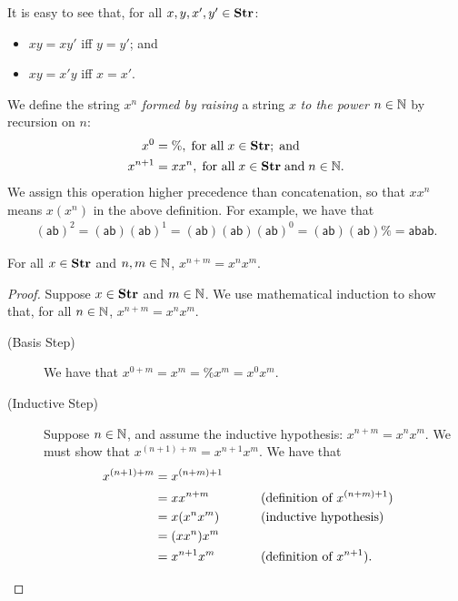 It is easy to see that, for all $x,y,x',y'\in\mathbf{Str}$:
\begin{itemize}
\item $xy=xy'$ iff $y=y'$; and

\item $xy=x'y$ iff $x=x'$.
\end{itemize}

We define the string $x^n$ \emph{formed by raising}
a string $x$ \emph{to the power}
%
%
%
%
%
$n\in\mathbb{N}$ by recursion
%
on $n$:
\begin{align*}
x^0       &= \%,\;\allowbreak\mbox{for all}\allowbreak\;x\in\mathbf{Str} ; \;\allowbreak\mbox{and}\allowbreak \\
x^{n + 1} &= xx^n,\;\allowbreak\mbox{for all}\allowbreak\;x\in\mathbf{Str}\;\allowbreak\mbox{and}\allowbreak\;n\in\mathbb{N} .
\end{align*}
We assign this operation higher precedence than concatenation, so that
$xx^n$ means $x(x^n)$ in the above definition.
For example, we have that
\begin{gather*}
(\mathsf{ab})^2 = 
(\mathsf{ab})(\mathsf{ab})^1 =
(\mathsf{ab})(\mathsf{ab})(\mathsf{ab})^0 =
(\mathsf{ab})(\mathsf{ab})\% =
\mathsf{abab} .
\end{gather*}

\begin{proposition}
\label{StrPowerProp}
For all $x\in\mathbf{Str}$ and $n,m\in\mathbb{N}$, $x^{n+m}=x^nx^m$.
\end{proposition}
%
%
%

\begin{proof}
Suppose $x\in\mathbf{Str}$ and $m\in\mathbb{N}$.  We use mathematical induction
%
to show that, for all $n\in\mathbb{N}$, $x^{n+m} = x^nx^m$.
\begin{description}
\item[\quad(Basis Step)] We have that $x^{0+m}=x^m=\%x^m=x^0x^m$.

\item[\quad(Inductive Step)] Suppose $n\in\mathbb{N}$, and assume the
inductive hypothesis: $x^{n+m} = x^nx^m$.  We must show
that $x^{(n+1)+m} = x^{n+1}x^m$.  We have that
\begin{alignat*}{2}
x^{(n+1)+m} &= x^{(n+m)+1} \\
            &= xx^{n+m} && \qquad{\textrm{(definition of $x^{(n+m)+1}$)}} \\
            &= x(x^nx^m) && \qquad{\textrm{(inductive hypothesis)}} \\
            &= (xx^n)x^m \\
            &= x^{n+1}x^m && \qquad{\textrm{(definition of $x^{n+1}$)}} .
\end{alignat*}
\end{description}
\end{proof}

